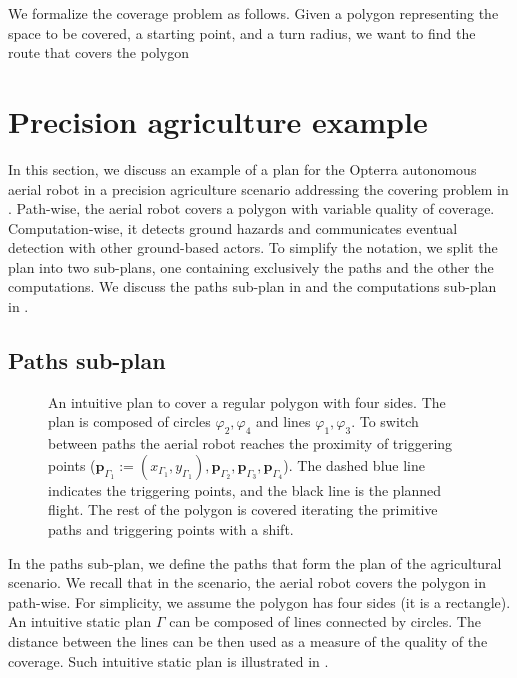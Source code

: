 We formalize the coverage problem as follows. Given a polygon representing the space to be covered, a starting point, and a turn radius, we want to find the route that covers the polygon 


\section{Precision agriculture example}
\label{sec:flight-plan}

In this section, we discuss an example of a plan for the Opterra autonomous aerial robot in a precision agriculture scenario addressing the covering problem in . Path-wise, the aerial robot covers a polygon with variable quality of coverage. Computation-wise, it detects ground hazards and communicates eventual detection with other ground-based actors. To simplify the notation, we split the plan into two sub-plans, one containing exclusively the paths and the other the computations. We discuss the paths sub-plan in  and the computations sub-plan in .

\subsection{Paths sub-plan}
\label{sec:path-wise}

\begin{figure}[h]
  \centering
  
  \caption[Intuitive plan to cover a regular polygon with four sides]{An intuitive plan to cover a regular polygon with four sides. The plan is composed of circles $\varphi_2,\varphi_4$ and lines $\varphi_1,\varphi_3$. To switch between paths the aerial robot reaches the proximity of triggering points ($\mathbf{p}_{\Gamma_1}:=(x_{\Gamma_1},y_{\Gamma_1}),\mathbf{p}_{\Gamma_2},\mathbf{p}_{\Gamma_3},\mathbf{p}_{\Gamma_4}$). The dashed blue line indicates the triggering points, and the black line is the planned flight. The rest of the polygon is covered iterating the primitive paths and triggering points with a shift.}
  \label{fig:plot3}
\end{figure}

In the paths sub-plan, we define the paths that form the plan of the agricultural scenario. We recall that in the scenario, the aerial robot covers the polygon in  path-wise. For simplicity, we assume the polygon has four sides (it is a rectangle). An intuitive static plan $\Gamma$ can be composed of lines connected by circles. The distance between the lines can be then used as a measure of the quality of the coverage. Such intuitive static plan is illustrated in .

